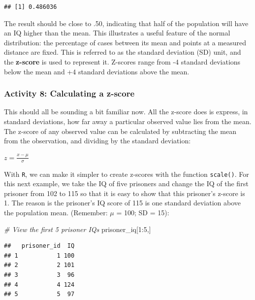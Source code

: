 \documentclass[
]{book}
\newenvironment{Shaded}{\begin{snugshade}}{\end{snugshade}}
\newcommand{\CommentTok}[1]{\textcolor[rgb]{0.56,0.35,0.01}{\textit{#1}}}
\newcommand{\DecValTok}[1]{\textcolor[rgb]{0.00,0.00,0.81}{#1}}
\newcommand{\NormalTok}[1]{#1}
\newcommand{\SpecialCharTok}[1]{\textcolor[rgb]{0.00,0.00,0.00}{#1}}
\begin{document}
\begin{verbatim}
## [1] 0.486036
\end{verbatim}

The result should be close to .50, indicating that half of the population will have an IQ higher than the mean. This illustrates a useful feature of the normal distribution: the percentage of cases between its mean and points at a measured distance are fixed. This is referred to as the standard deviation (SD) unit, and the \textbf{z-score} is used to represent it. Z-scores range from -4 standard deviations below the mean and +4 standard deviations above the mean.

\hypertarget{activity-8-calculating-a-z-score}{%
\subsubsection{Activity 8: Calculating a z-score}\label{activity-8-calculating-a-z-score}}

This should all be sounding a bit familiar now. All the z-score does is express, in standard deviations, how far away a particular observed value lies from the mean. The z-score of any observed value can be calculated by subtracting the mean from the observation, and dividing by the standard deviation:

\(z = \frac{x - \mu}{\sigma}\)

With \texttt{R}, we can make it simpler to create z-scores with the function \texttt{scale()}. For this next example, we take the IQ of five prisoners and change the IQ of the first prisoner from 102 to 115 so that it is easy to show that this prisoner's z-score is 1. The reason is the prisoner's IQ score of 115 is one standard deviation above the population mean. (Remember: \(\mu\) = 100; SD = 15):

\begin{Shaded}
\begin{Highlighting}[]
\CommentTok{\# View the first 5 prisoner IQs}
\NormalTok{prisoner\_iq[}\DecValTok{1}\SpecialCharTok{:}\DecValTok{5}\NormalTok{,] }
\end{Highlighting}
\end{Shaded}

\begin{verbatim}
##   prisoner_id  IQ
## 1           1 100
## 2           2 101
## 3           3  96
## 4           4 124
## 5           5  97
\end{verbatim}
\end{document}
